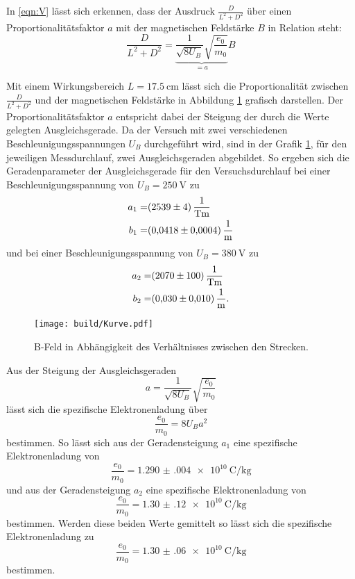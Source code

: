 In \eqref{eqn:V} lässt sich erkennen, dass der Ausdruck $\frac{D}{L^2 + D^2}$ über einen Proportionalitätsfaktor $a$ mit der magnetischen Feldstärke $B$ in Relation steht:
\begin{equation*}
    \frac{D}{L^2 + D^2} = \underbrace{\frac{1}{\sqrt{8U_B}} \sqrt{ \frac{e_0}{m_0}}}_{=a} B
\end{equation*}

Mit einem Wirkungsbereich $L=\SI{17.5}{\centi\m}$ lässt sich die Proportionalität zwischen $\frac{D}{L^2 + D^2}$ und der magnetischen Feldstärke in Abbildung \ref{fig:Kurve} grafisch darstellen. Der Proportionalitätsfaktor $a$ entspricht dabei der Steigung der durch die Werte gelegten Ausgleichsgerade. Da der Versuch mit zwei verschiedenen Beschleunigungsspannungen $U_B$ durchgeführt wird, sind in der Grafik \ref{fig:Kurve}, für den jeweiligen Messdurchlauf, zwei Ausgleichsgeraden abgebildet.
So ergeben sich die Geradenparameter der Ausgleichsgerade für den Versuchsdurchlauf bei einer Beschleunigungsspannung von $U_B=\SI{250}{\V}$ zu 
\begin{align*}
    a_1=&\SI{2539(4)}{\frac{1}{\tesla\meter}} \\
    b_1=&\SI{0.0418(0004)}{\frac{1}{\meter}}
\end{align*}
und bei einer Beschleunigungsspannung von $U_B=\SI{380}{\V}$ 
zu
\begin{align*}
    a_2=&\SI{2070(100)}{\frac{1}{\tesla\meter}} \\
    b_2=&\SI{0.030(010)}{\frac{1}{\meter}}.
\end{align*}

\begin{figure}
    \centering
    \texttt{[image: build/Kurve.pdf]}
    \caption{B-Feld in Abhängigkeit des Verhältnisses zwischen den Strecken.}
    \label{fig:Kurve}
\end{figure}

Aus der Steigung der Ausgleichsgeraden
\begin{equation*}
    a=\frac{1}{\sqrt{8U_B}} \sqrt{ \frac{e_0}{m_0}}
\end{equation*}
lässt sich die spezifische Elektronenladung über
\begin{equation}
    \frac{e_0}{m_0}=8U_Ba^2
\end{equation}
bestimmen.
So lässt sich aus der Geradensteigung $a_1$ eine spezifische Elektronenladung von 
\begin{equation*}
    \frac{e_0}{m_0}=\SI{1.290(004)e10}{\coulomb\per\kilo\g}
\end{equation*} 
und aus der Geradensteigung $a_2$ eine spezifische Elektronenladung von
\begin{equation*}
    \frac{e_0}{m_0}=\SI{1.30(12)e10}{\coulomb\per\kilo\g}
\end{equation*}
bestimmen.
Werden diese beiden Werte gemittelt so lässt sich die spezifische Elektronenladung zu 
\begin{equation*}
    \frac{e_0}{m_0}=\SI{1.30(06)e10}{\coulomb\per\kilo\g}
\end{equation*} 
bestimmen.




